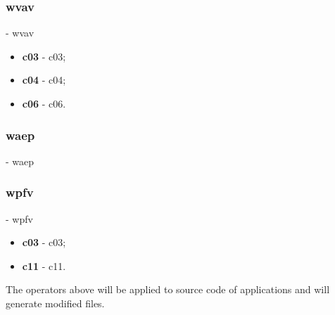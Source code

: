 	\hypertarget{wvav}{}
	\subsubsection{\textbf{\acs{wvav}}} - \Acl{wvav}

	\begin{itemize}
		\item \textbf{\acs{c03}} - \Acl{c03};
		\item \textbf{\acs{c04}} - \Acl{c04};
		\item \textbf{\acs{c06}} - \Acl{c06}.
	\end{itemize}

	\hypertarget{waep}{}
	\subsubsection{\textbf{\acs{waep}}} - \Acl{waep}




	\hypertarget{wpfv}{}
	\subsubsection{\textbf{\acs{wpfv}}} - \Acl{wpfv}

	\begin{itemize}
		\item \textbf{\acs{c03}} - \Acl{c03};
		\item \textbf{\acs{c11}} - \Acl{c11}.
	\end{itemize}

The operators above will be applied to source code of applications and will generate modified files.

